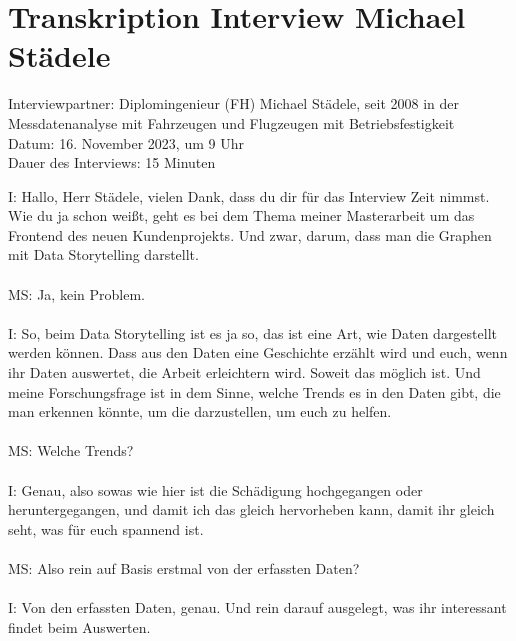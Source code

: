 \section{Transkription Interview Michael Städele}
\label{appendix:interview_trends_staedele}
Interviewpartner: Diplomingenieur (FH) Michael Städele, seit 2008 in der Messdatenanalyse mit Fahrzeugen und Flugzeugen mit Betriebsfestigkeit\\
Datum: 16. November 2023, um 9 Uhr\\
Dauer des Interviews: 15 Minuten\\

\begin{linenumbers}
\noindent
I: Hallo, Herr Städele, vielen Dank, dass du dir für das Interview Zeit nimmst. Wie du ja schon weißt, geht es bei dem Thema meiner Masterarbeit um das Frontend des neuen Kundenprojekts. Und zwar, darum, dass man die Graphen mit Data Storytelling darstellt. \\\\
MS: Ja, kein Problem.\\\\
I: So, beim Data Storytelling ist es ja so, das ist eine Art, wie Daten dargestellt werden können. Dass aus den Daten eine Geschichte erzählt wird und euch, wenn ihr Daten auswertet, die Arbeit erleichtern wird. Soweit das möglich ist. Und meine Forschungsfrage ist in dem Sinne, welche Trends es in den Daten gibt, die man erkennen könnte, um die darzustellen, um euch zu helfen.\\\\
MS: Welche Trends?\\\\
I: Genau, also sowas wie hier ist die Schädigung hochgegangen oder heruntergegangen, und damit ich das gleich hervorheben kann, damit ihr gleich seht, was für euch spannend ist.\\\\
MS: Also rein auf Basis erstmal von der erfassten Daten?\\\\
I: Von den erfassten Daten, genau. Und rein darauf ausgelegt, was ihr interessant findet beim Auswerten.\\\\

\end{linenumbers}

